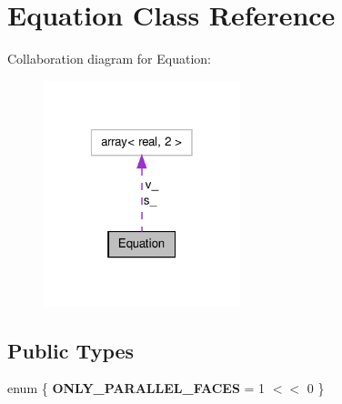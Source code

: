 \hypertarget{classEquation}{\section{Equation Class Reference}
\label{classEquation}
}


Collaboration diagram for Equation\-:\nopagebreak
\begin{figure}[H]
\begin{center}
\leavevmode
\includegraphics[width=162pt]{classEquation__coll__graph}
\end{center}
\end{figure}
\subsection*{Public Types}
\begin{DoxyCompactItemize}
\item 
enum \{ {\bfseries O\-N\-L\-Y\-\_\-\-P\-A\-R\-A\-L\-L\-E\-L\-\_\-\-F\-A\-C\-E\-S} =  1 $<$$<$ 0
 \}
\end{DoxyCompactItemize}
